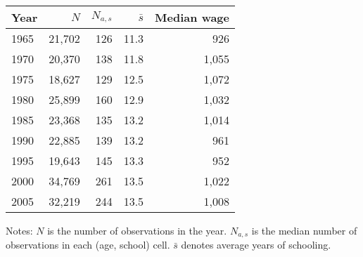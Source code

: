\begin{tabular}{lrrrr}
\hline
Year & $N$  & $N_{a,s}$  & $\bar{s}$  & Median wage  \\ 
\hline
1965 & 21,702  & 126  & 11.3  & 926  \\ 
1970 & 20,370  & 138  & 11.8  & 1,055  \\ 
1975 & 18,627  & 129  & 12.5  & 1,072  \\ 
1980 & 25,899  & 160  & 12.9  & 1,032  \\ 
1985 & 23,368  & 135  & 13.2  & 1,014  \\ 
1990 & 22,885  & 139  & 13.2  & 961  \\ 
1995 & 19,643  & 145  & 13.3  & 952  \\ 
2000 & 34,769  & 261  & 13.5  & 1,022  \\ 
2005 & 32,219  & 244  & 13.5  & 1,008  \\ 
\hline
\end{tabular}%

 \vspace{5 mm} 
\small 
Notes: $N$ is the number of observations in the year. 
$N_{a,s}$ is the median number of observations in each (age, school) cell. 
$\bar{s}$ denotes average years of schooling.
\normalsize 
